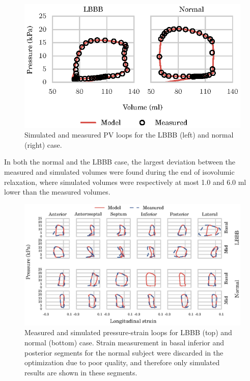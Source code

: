 \begin{figure}[htbp]
  \centering
  \includegraphics{figures/pv_loop}
  \caption{\label{fig:pv_loops}Simulated and measured PV loops
    for the LBBB (left) and normal (right) case. }
\end{figure}

In both the normal and the LBBB case, the
largest deviation between the measured and simulated volumes were found
during the end of isovolumic relaxation, where simulated volumes were
respectively at most 1.0 and 6.0 ml lower than the measured volumes.


\begin{figure}[htbp]
  \centering
  \includegraphics{figures/pressure_strain_loop}
\caption{\label{fig:regional_strain_pressure_loops}Measured and
simulated pressure-strain loops for LBBB (top) and normal (bottom)
case. Strain measurement in basal inferior and posterior segments for
the normal subject were discarded in the optimization due to poor
quality, and therefore only simulated results are shown in these
segments.} 
\end{figure}



